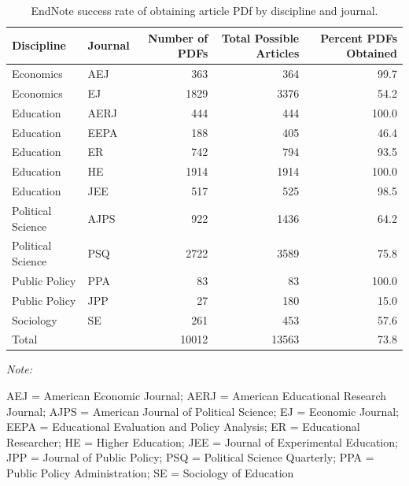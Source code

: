 \documentclass[
  english,
  ,man]{apa7}
\begin{document}
\begin{table}[!h]

\caption{\label{tab:setup}EndNote success rate of obtaining article PDf by discipline and journal.}
\centering
\begin{threeparttable}
\begin{tabular}[t]{llrrr}
\toprule
Discipline & Journal & Number of PDFs & Total Possible Articles & Percent PDFs Obtained\\
\midrule
Economics & AEJ & 363 & 364 & 99.7\\
Economics & EJ & 1829 & 3376 & 54.2\\
Education & AERJ & 444 & 444 & 100.0\\
Education & EEPA & 188 & 405 & 46.4\\
Education & ER & 742 & 794 & 93.5\\
\addlinespace
Education & HE & 1914 & 1914 & 100.0\\
Education & JEE & 517 & 525 & 98.5\\
Political Science & AJPS & 922 & 1436 & 64.2\\
Political Science & PSQ & 2722 & 3589 & 75.8\\
Public Policy & PPA & 83 & 83 & 100.0\\
\addlinespace
Public Policy & JPP & 27 & 180 & 15.0\\
Sociology & SE & 261 & 453 & 57.6\\
\hline
Total &  & 10012 & 13563 & 73.8\\
\bottomrule
\end{tabular}
\begin{tablenotes}
\item \textit{Note: } 
\item AEJ = American Economic Journal; AERJ = American Educational Research Journal; AJPS = American Journal of Political Science; EJ = Economic Journal; EEPA = Educational Evaluation and Policy Analysis; ER = Educational Researcher; HE = Higher Education; JEE = Journal of Experimental Education; JPP = Journal of Public Policy; PSQ = Political Science Quarterly; PPA = Public Policy Administration; SE = Sociology of Education
\end{tablenotes}
\end{threeparttable}
\end{table}
\end{document}
